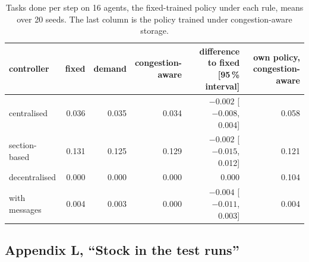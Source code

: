 \documentclass[11pt,a4paper]{article}
\newcommand{\new}[1]{\textcolor{newc}{#1}}
\begin{document}
\begin{table}[h]
  \centering
  \small
  \setlength{\tabcolsep}{4pt}
  \caption{\new{Tasks done per step on 16 agents, the fixed-trained policy under each rule, means over
  20 seeds. The last column is the policy trained under congestion-aware storage.}}
  \label{tab:app:regime1:16}
  \begin{tabular}{lrrrrr}
    \toprule
    controller & fixed & demand & \shortstack{congestion-\\aware} & \shortstack{difference to fixed\\{[95\,\% interval]}} & \shortstack{own policy,\\congestion-aware} \\
    \midrule
    centralised    & 0.036 & 0.035 & 0.034 & $-0.002$ [$-0.008$, 0.004] & 0.058 \\
    section-based  & 0.131 & 0.125 & 0.129 & $-0.002$ [$-0.015$, 0.012] & 0.121 \\
    decentralised  & 0.000 & 0.000 & 0.000 & 0.000 & 0.104 \\
    with messages  & 0.004 & 0.003 & 0.000 & $-0.004$ [$-0.011$, 0.003] & 0.004 \\
    \bottomrule
  \end{tabular}
\end{table}

\subsection*{Appendix L, ``Stock in the test runs''}
\end{document}
